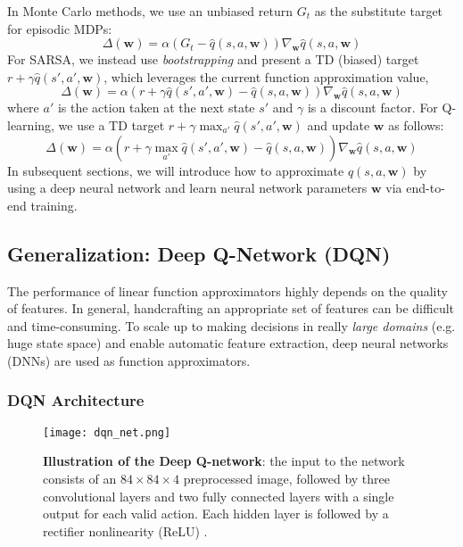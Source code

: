 \documentclass{article}
\newcommand{\w}{\mathbf{w}}
\begin{document}
In Monte Carlo methods, we use an unbiased return $G_t$ as the substitute target for episodic MDPs:
\begin{equation} \label{update_w_MC}
  \Delta(\w) = \alpha (G_t - \hat{q}(s,a, \w) ) \nabla_\w \hat{q}(s,a, \w)
\end{equation}
For SARSA, we instead use \textit{bootstrapping} and present a TD (biased) target $r + \gamma \hat{q}(s',a', \w)$, which leverages the current function approximation value,
\begin{equation} \label{update_w_SARSA}
  \Delta(\w) = \alpha (r + \gamma \hat{q}(s',a', \w) - \hat{q}(s,a, \w) ) \nabla_\w \hat{q}(s,a, \w)
\end{equation}
where $a'$ is the action taken at the next state $s'$ and $\gamma$ is a discount factor. For Q-learning, we use a TD target $r + \gamma \max_{a'} \hat{q}(s',a', \w)$ and update $\w$ as follows:
\begin{equation} \label{update_w_Q}
  \Delta(\w) = \alpha (r + \gamma \max_{a'} \hat{q}(s',a', \w) - \hat{q}(s,a, \w) ) \nabla_\w \hat{q}(s,a, \w)
\end{equation}
In subsequent sections, we will introduce how to approximate $\hat{q}(s,a, \w)$ by using a deep neural network and learn neural network parameters $\w$ via end-to-end training.

\subsection{Generalization: Deep Q-Network (DQN) \cite{ref_DQN}}
The performance of linear function approximators highly depends on the quality of features. In general, handcrafting an appropriate set of features can be difficult and time-consuming. To scale up to making decisions in really \textit{large domains} (e.g. huge state space) and enable automatic feature extraction, deep neural networks (DNNs) are used as function approximators.

\subsubsection{DQN Architecture}

\begin{figure}
    \centering
    \texttt{[image: dqn\_net.png]}
     \caption{\textbf{Illustration of the Deep Q-network}: the input to the network consists of an $84 \times 84 \times 4$ preprocessed image, followed by three convolutional layers and two fully connected layers with a single output for each valid action. Each hidden layer is followed by a rectifier nonlinearity (ReLU) \cite{ref_relu}.}
     \label{fig:dqn}
 \end{figure}
\end{document}
